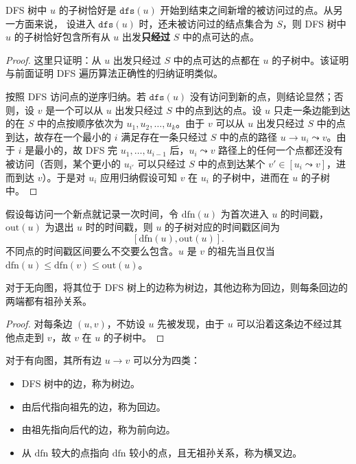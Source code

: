 \begin{lemma}\label{lem:dfs-undiscovered-path}
    DFS 树中 $u$ 的子树恰好是 $\mathtt{dfs}(u)$ 开始到结束之间新增的被访问过的点。从另一方面来说，
    设进入 $\mathtt{dfs}(u)$ 时，还未被访问过的结点集合为 $S$，则 DFS 树中 $u$ 的子树恰好包含所有从 $u$ 出发\textbf{只经过} $S$ 中的点可达的点。
\end{lemma}
\begin{proof}
    这里只证明：从 $u$ 出发只经过 $S$ 中的点可达的点都在 $u$ 的子树中。该证明与前面证明 DFS 遍历算法正确性的归纳证明类似。
    
    按照 DFS 访问点的逆序归纳。若 $\mathtt{dfs}(u)$ 没有访问到新的点，则结论显然；否则，设 $v$ 是一个可以从 $u$ 出发只经过 $S$ 中的点到达的点。设 $u$ 只走一条边能到达的在 $S$ 中的点按顺序依次为 $u_1,u_2,\ldots,u_k$。由于 $v$ 可以从 $u$ 出发只经过 $S$ 中的点到达，故存在一个最小的 $i$ 满足存在一条只经过 $S$ 中的点的路径 $u\to u_i\leadsto v$。由于 $i$ 是最小的，故 DFS 完 $u_1,\ldots,u_{i-1}$ 后，$u_i\leadsto v$ 路径上的任何一个点都还没有被访问（否则，某个更小的 $u_{i'}$ 可以只经过 $S$ 中的点到达某个 $v'\in [u_i\leadsto v]$，进而到达 $v$）。于是对 $u_i$ 应用归纳假设可知 $v$ 在 $u_i$ 的子树中，进而在 $u$ 的子树中。
\end{proof}

假设每访问一个新点就记录一次时间，令 $\mathrm{dfn}(u)$ 为首次进入 $u$ 的时间戳，$\mathrm{out}(u)$ 为退出 $u$ 时的时间戳，则 $u$ 的子树对应的时间戳区间为
\[
    [\mathrm{dfn}(u),\mathrm{out}(u)].
\]
不同点的时间戳区间要么不交要么包含。$u$ 是 $v$ 的祖先当且仅当 $\mathrm{dfn}(u)\le\mathrm{dfn}(v)\le\mathrm{out}(u)$。

\begin{theorem}[无向图的边分类]
    对于无向图，将其位于 DFS 树上的边称为树边，其他边称为回边，则每条回边的两端都有祖孙关系。
\end{theorem}
\begin{proof}
    对每条边 $(u,v)$，不妨设 $u$ 先被发现，由于 $u$ 可以沿着这条边不经过其他点走到 $v$，故 $v$ 在 $u$ 的子树中。
\end{proof}

\begin{theorem}[有向图的边分类]
    对于有向图，其所有边 $u\to v$ 可以分为四类：
    \begin{itemize}
        \item DFS 树中的边，称为树边。
        \item 由后代指向祖先的边，称为回边。
        \item 由祖先指向后代的边，称为前向边。
        \item 从 $\mathrm{dfn}$ 较大的点指向 $\mathrm{dfn}$ 较小的点，且无祖孙关系，称为横叉边。
    \end{itemize}
\end{theorem}

